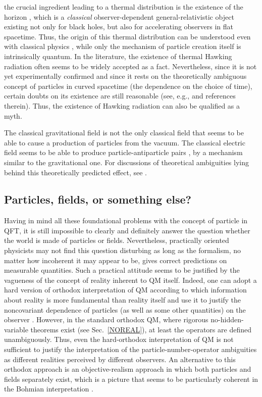 \documentclass[12pt]{article}
\begin{document}
the crucial ingredient leading to a thermal distribution
is the existence of the horizon \cite{padmrep},
which is a {\em classical} observer-dependent general-relativistic 
object existing not only for black holes, but also for 
accelerating observers in flat spacetime. 
Thus, the origin of this thermal distribution 
can be understood even with classical 
physics \cite{padmclas}, while only the mechanism of particle creation 
itself is intrinsically quantum. In the literature, 
the existence of thermal Hawking 
radiation often seems to be widely accepted as a fact. Nevertheless, since 
it is not yet experimentally confirmed and since it rests 
on the theoretically ambiguous concept of particles in curved spacetime
(the dependence on the choice of time), 
certain doubts on its existence are still reasonable (see, e.g.,
\cite{padmprl,nikolcur,bel} and references therein).
Thus, the existence of Hawking radiation can also be qualified as a myth.

The classical gravitational field is not the only classical 
field that seems to be able to cause a production of 
particles from the vacuum. 
The classical electric field seems to be able to produce 
particle-antiparticle pairs \cite{schw,manog,brout}, 
by a mechanism similar to the gravitational one. For discussions 
of theoretical ambiguities lying behind this theoretically predicted 
effect, see \cite{padmprl,nikolcur,nikolcrit}. 
  
\subsection{Particles, fields, or something else?}

Having in mind all these foundational problems with the concept of particle
in QFT, it is still impossible to clearly and definitely 
answer the question whether the 
world is made of particles or fields. Nevertheless, practically oriented 
physicists may not find this question disturbing as long as the 
formalism, no matter how incoherent it may appear to be, 
gives correct predictions on measurable quantities. 
Such a practical attitude seems to be justified by the 
vagueness of the concept of reality inherent to QM itself. 
Indeed, one can
adopt a hard version of orthodox interpretation of QM according 
to which information about reality is more fundamental
than reality itself and use it to justify  
the noncovariant dependence of particles (as well as some other 
quantities) on the observer \cite{peres}. However, in the standard 
orthodox QM, where rigorous no-hidden-variable theorems exist (see
Sec.~\ref{NOREAL}),
at least the operators are defined unambiguously.
Thus, even the hard-orthodox interpretation of 
QM is not sufficient to justify the interpretation of the  
particle-number-operator ambiguities as different realities 
perceived by different observers. An alternative to this 
orthodox approach is an objective-realism approach in which 
both particles and fields separately exist, which is a 
picture that seems to be particularly coherent in the 
Bohmian interpretation \cite{nikolpf}.    
\end{document}
